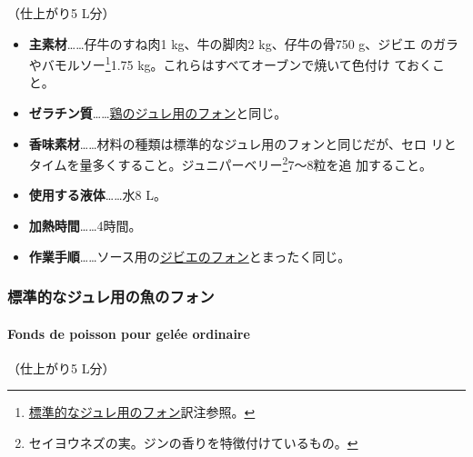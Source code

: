\begin{recette}
（仕上がり5 L分）

\begin{itemize}
\item
  \textbf{主素材}\ldots{}\ldots{}仔牛のすね肉1 kg、牛の脚肉2
  kg、仔牛の骨750 g、ジビエ のガラやバモルソー\footnote{\protect\hyperlink{fonds-pour-gelee-ordinaire}{標準的なジュレ用のフォン}訳注参照。}1.75
  kg。これらはすべてオーブンで焼いて色付け ておくこと。
\item
  \textbf{ゼラチン質}\ldots{}\ldots{}\protect\hyperlink{fonds-pour-gelee-de-volaille}{鶏のジュレ用のフォン}と同じ。
\item
  \textbf{香味素材}\ldots{}\ldots{}材料の種類は標準的なジュレ用のフォンと同じだが、セロ
  リとタイムを\untiers{}量多くすること。ジュニパーベリー\footnote{セイヨウネズの実。ジンの香りを特徴付けているもの。}7〜8粒を追
  加すること。
\item
  \textbf{使用する液体}\ldots{}\ldots{}水8 L。
\item
  \textbf{加熱時間}\ldots{}\ldots{}4時間。
\item
  \textbf{作業手順}\ldots{}\ldots{}ソース用の\protect\hyperlink{fonds-de-gibier}{ジビエのフォン}とまったく同じ。
\end{itemize}

\maeaki

\hypertarget{ux6a19ux6e96ux7684ux306aux30b8ux30e5ux30ecux7528ux306eux9b5aux306eux30d5ux30a9ux30f3}{%
\subsubsection{標準的なジュレ用の魚のフォン}\label{ux6a19ux6e96ux7684ux306aux30b8ux30e5ux30ecux7528ux306eux9b5aux306eux30d5ux30a9ux30f3}}

\hypertarget{fonds-de-poisson-pour-gelee-ordinaire}{%
\paragraph{Fonds de poisson pour gelée
ordinaire}\label{fonds-de-poisson-pour-gelee-ordinaire}}


（仕上がり5 L分）


\end{recette}
